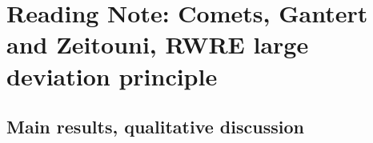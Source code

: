 \section{Reading Note: Comets, Gantert and Zeitouni, RWRE large deviation principle}

\subsection{Main results, qualitative discussion}

